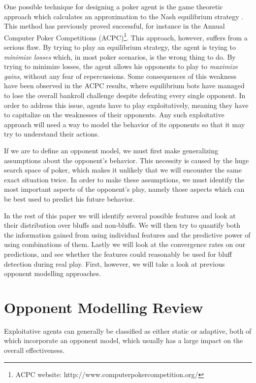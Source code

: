 \documentclass[letterpaper]{article}
\begin{document}
One possible technique for designing a poker agent is the game theoretic approach which calculates an approximation to the Nash equilibrium strategy \cite{P11,P12}. This method has previously proved successful, for instance in the Annual Computer Poker Competitions (ACPC)\footnote{ACPC website: http://www.computerpokercompetition.org/}. This approach, however, suffers from a serious flaw. By trying to play an equilibrium strategy, the agent is trying to \emph{minimize losses} which, in most poker scenarios, is the wrong thing to do. By trying to minimize losses, the agent allows his opponents to play to \emph{maximize gains}, without any fear of repercussions. Some consequences of this weakness have been observed in the ACPC results, where equilibrium bots have managed to lose the overall bankroll challenge despite defeating every single opponent. In order to address this issue, agents have to play exploitatively, meaning they have to capitalize on the weaknesses of their opponents. Any such exploitative approach will need a way to model the behavior of its opponents so that it may try to understand their actions.

If we are to define an opponent model, we must first make generalizing assumptions about the opponent's behavior. This necessity is caused by the huge search space of poker, which makes it unlikely that we will encounter the same exact situation twice. In order to make these assumptions, we must identify the most important aspects of the opponent's play, namely those aspects which can be best used to predict his future behavior.

In the rest of this paper we will identify several possible features and look at their distribution over bluffs and non-bluffs. We will then try to quantify both the information gained from using individual features and the predictive power of using combinations of them. Lastly we will look at the convergence rates on our predictions, and see whether the features could reasonably be used for bluff detection during real play. First, however, we will take a look at previous opponent modelling approaches.


\section{
\fontsize{12pt}{15pt} 
\selectfont
Opponent Modelling Review}
\fontsize{10pt}{12pt} 
\selectfont
Exploitative agents can generally be classified as either static or adaptive, both of which incorporate an opponent model, which usually has a large impact on the overall effectiveness. \cite{P1} 
\end{document}
